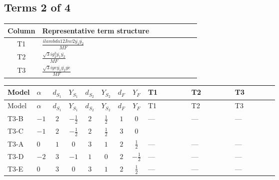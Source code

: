 \documentclass[8pt]{article}
\begin{document}
\begin{landscape}
\subsection*{Terms 2 of 4}
\begin{center}
\begin{tabular}{@{}c >{\raggedright\arraybackslash}p{0.82\linewidth}@{}}
\toprule
Column & Representative term structure \\
\midrule
T1 & \(\displaystyle \frac{i lambda12Inv2 \overline{y_{1}} \overline{y_{2}}}{MF}\) \\
\midrule
T2 & \(\displaystyle \frac{\sqrt{3} i g_{2}^{2} \overline{y_{1}} \overline{y_{2}}}{MF}\) \\
\midrule
T3 & \(\displaystyle \frac{\sqrt{3} i ye \overline{y_{1}} \overline{y_{2}} \overline{ye}}{MF}\) \\
\midrule
\bottomrule
\end{tabular}
\end{center}
\smallskip
\tiny
\begin{longtable}{@{}llcccccc >{\raggedright\arraybackslash}p{0.21\linewidth} >{\raggedright\arraybackslash}p{0.21\linewidth} >{\raggedright\arraybackslash}p{0.21\linewidth}@{}}
\toprule
Model & $\alpha$ & $d_{S_1}$ & $Y_{S_1}$ & $d_{S_2}$ & $Y_{S_2}$ & $d_F$ & $Y_F$ & T1 & T2 & T3 \\
\midrule
\endfirsthead
\toprule
Model & $\alpha$ & $d_{S_1}$ & $Y_{S_1}$ & $d_{S_2}$ & $Y_{S_2}$ & $d_F$ & $Y_F$ & T1 & T2 & T3 \\
\midrule
\endhead
T3-B & $-1$ & $2$ & $-\frac{1}{2}$ & $2$ & $\frac{1}{2}$ & $1$ & $0$ & --- & --- & --- \\
\midrule
T3-C & $-1$ & $2$ & $-\frac{1}{2}$ & $2$ & $\frac{1}{2}$ & $3$ & $0$ & \scriptsize\adjustbox{max width=\linewidth}{$\begin{gathered} - \frac{i lambda12Inv2 \overline{y_{1}} \overline{y_{2}}}{3 MF}\end{gathered}$} & \scriptsize\adjustbox{max width=\linewidth}{$\begin{gathered} - \frac{\sqrt{3} i g_{2}^{2} \overline{y_{1}} \overline{y_{2}}}{4 MF}\end{gathered}$} & \scriptsize\adjustbox{max width=\linewidth}{$\begin{gathered} \frac{\sqrt{3} i ye \overline{y_{1}} \overline{y_{2}} \overline{ye}}{12 MF}\end{gathered}$} \\
\midrule
T3-A & $0$ & $1$ & $0$ & $3$ & $1$ & $2$ & $\frac{1}{2}$ & --- & --- & --- \\
\midrule
T3-D & $-2$ & $3$ & $-1$ & $1$ & $0$ & $2$ & $-\frac{1}{2}$ & --- & --- & --- \\
\midrule
T3-E & $0$ & $3$ & $0$ & $3$ & $1$ & $2$ & $\frac{1}{2}$ & --- & --- & --- \\
\midrule
\bottomrule
\end{longtable}
\clearpage

\end{landscape}
\end{document}
